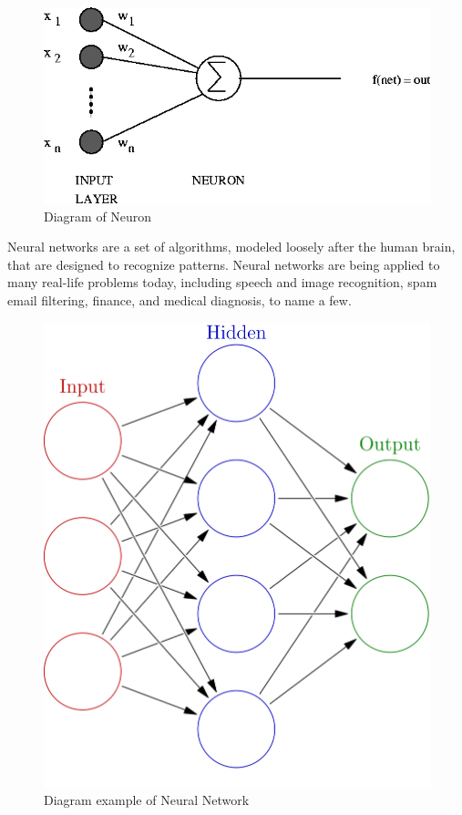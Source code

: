 \documentclass[a4paper,12pt]{report}
\begin{document}
\begin{figure}[h]
\begin{center}
\includegraphics[scale=.4]{images/Neuron.png}
\caption{Diagram of Neuron}
\label{fig:neuron}
\end{center}
\end{figure}
Neural networks are a set of algorithms, modeled loosely after the human brain, that are designed to recognize patterns. Neural networks are being applied to many real-life problems today, including speech and image recognition, spam email filtering, finance, and medical diagnosis, to name a few.
\begin{figure}[h]
\begin{center}
\includegraphics[scale=.18]{images/NeuralNetwork.png}
\caption{Diagram example of Neural Network}
\label{fig:NeuralNetwork}
\end{center}
\end{figure}
\end{document}
